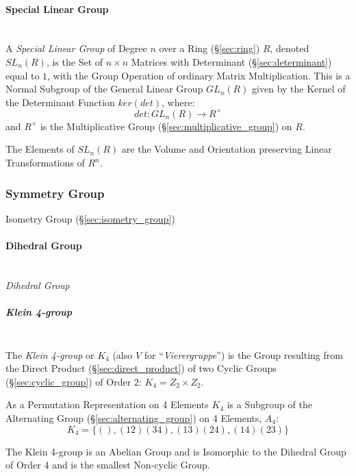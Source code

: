 \paragraph{Special Linear Group}\label{sec:special_linear_group}
\hfill \\

A \emph{Special Linear Group} of Degree $n$ over a Ring
(\S\ref{sec:ring}) $R$, denoted $SL_n(R)$, is the Set of $n \times n$
Matrices with Determinant (\S\ref{sec:determinant}) equal to $1$, with
the Group Operation of ordinary Matrix Multiplication. This is a
Normal Subgroup of the General Linear Group $GL_n(R)$ given by the
Kernel of the Determinant Function $ker(det)$, where:
\[
  det : GL_n(R) \rightarrow R^\times
\]
and $R^\times$ is the Multiplicative Group
(\S\ref{sec:multiplicative_group}) on $R$.

The Elements of $SL_n(R)$ are the Volume and Orientation preserving
Linear Transformations of $R^n$.



\subsubsection{Symmetry Group}\label{sec:symmetry_group}

Isometry Group (\S\ref{sec:isometry_group})



\paragraph{Dihedral Group}\label{sec:dihedral_group}
\hfill \\

\emph{Dihedral Group}


\subparagraph{Klein 4-group}\label{sec:klein_4group}
\hfill \\

The \emph{Klein 4-group} or $K_4$ (also $V$ for
``\emph{Vierergruppe}'') is the Group resulting from the Direct
Product (\S\ref{sec:direct_product}) of two Cyclic Groups
(\S\ref{sec:cyclic_group}) of Order 2: $K_4 = Z_2 \times Z_2$.

As a Permutation Representation on 4 Elements $K_4$ is a Subgroup of
the Alternating Group (\S\ref{sec:alternating_group}) on 4 Elements,
$A_4$:
\[
    K_4 = \{ (), (12)(34), (13)(24), (14)(23) \}
\]

The Klein 4-group is an Abelian Group and is Isomorphic to the
Dihedral Group of Order 4 and is the smallest Non-cyclic Group.

